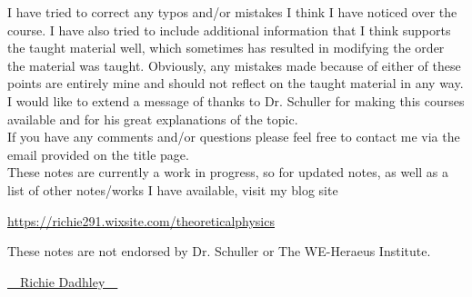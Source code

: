 \documentclass[11pt,oneside]{book}
\theoremstyle{definition} %
\theoremstyle{plain} %
\theoremstyle{remark} %
\theoremstyle{underline}
\begin{document}
I have tried to correct any typos and/or mistakes I think I have noticed over the course. I have also tried to include additional information that I think supports the taught material well, which sometimes has resulted in modifying the order the material was taught. Obviously, any mistakes made because of either of these points are entirely mine and should not reflect on the taught material in any way. \\



I would like to extend a message of thanks to Dr. Schuller for making this courses available and for his great explanations of the topic. \\

If you have any comments and/or questions please feel free to contact me via the email provided on the title page. \\

These notes are currently a work in progress, so for updated notes, as well as a list of other notes/works I have available, visit my blog site

\begin{center}
    \href{https://richie291.wixsite.com/theoreticalphysics}{https://richie291.wixsite.com/theoreticalphysics}
\end{center}

These notes are not endorsed by Dr. Schuller or The WE-Heraeus Institute.
\vspace{1cm}

\begin{flushright}
    \Huge{{\cursive\setul{0.1ex}{}\ul{~~Richie Dadhley~~}}}
\end{flushright}



\tableofcontents

\end{document}
